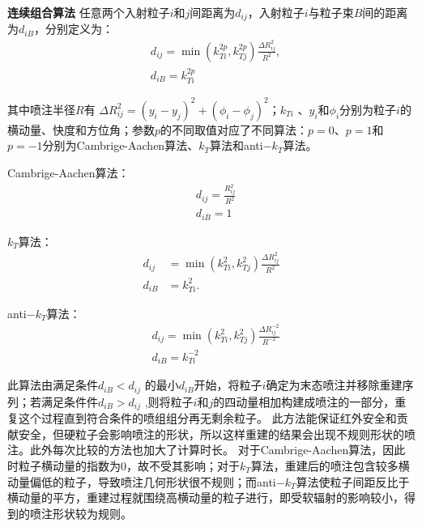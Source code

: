 	\textbf{连续组合算法}
		任意两个入射粒子$i$和$j$间距离为$d_{ij}$，入射粒子$i$与粒子束$B$间的距离为$d_{iB}$，分别定义为：
\begin{equation}
\begin{aligned}
	& d_{i j}=\min \left(k_{T i}^{2 p}, k_{T j}^{2 p}\right) \frac{\Delta R_{i j}^2}{R^2}, \\
	& d_{i B}=k_{T i}^{2 p}
\end{aligned}
\end{equation}

	其中喷注半径$R$有 $\Delta R_{ij}^2 = \left(y_i-y_j\right)^2+\left(\phi_i-\phi_j\right)^2$；$k_{Ti}$ 、$y_i$和$\phi_i$分别为粒子$i$的横动量、快度和方位角；参数$p$的不同取值对应了不同算法：$p=0$、$p=1$和$p=-1$分别为Cambrige-Aachen算法、$k_T$算法和anti$-k_T$算法。
	
	Cambrige-Aachen算法：
\begin{equation}
	\begin{aligned}
		& d_{i j}=\frac{R_{i j}^2}{R^2} \\
		& d_{i B}=1
	\end{aligned}
\end{equation}

	$k_T$算法：
\begin{equation}
	\begin{aligned}
		d_{i j} & =\min \left(k_{T i}^2, k_{T j}^2\right) \frac{\Delta R_{i j}^2}{R^2} \\
		d_{i B} & =k_{T i}^2 .
	\end{aligned}
\end{equation}

	anti$-k_T$算法：
\begin{equation}
	\begin{aligned}
		& d_{i j}=\min \left(k_{T i}^2, k_{T j}^2\right) \frac{\Delta R_{i j}^{-2}}{R^{-2}} \\
		& d_{i B}=k_{T i}^{-2}
	\end{aligned}
\end{equation}

此算法由满足条件$d_{iB} < d_{ij}$ 的最小$d_{iB}$开始，将粒子$i$确定为末态喷注并移除重建序列；若满足条件件$d_{iB} > d_{ij}$ ,则将粒子$i$和$j$的四动量相加构建成喷注的一部分，重复这个过程直到符合条件的喷组组分再无剩余粒子。
此方法能保证红外安全和贡献安全，但硬粒子会影响喷注的形状，所以这样重建的结果会出现不规则形状的喷注。此外每次比较的方法也加大了计算时长。
对于Cambrige-Aachen算法，因此时粒子横动量的指数为0，故不受其影响；对于$k_T$算法，重建后的喷注包含较多横动量偏低的粒子，导致喷注几何形状很不规则；而anti$-k_T$算法使粒子间距反比于横动量的平方，重建过程就围绕高横动量的粒子进行，即受软辐射的影响较小，得到的喷注形状较为规则。

